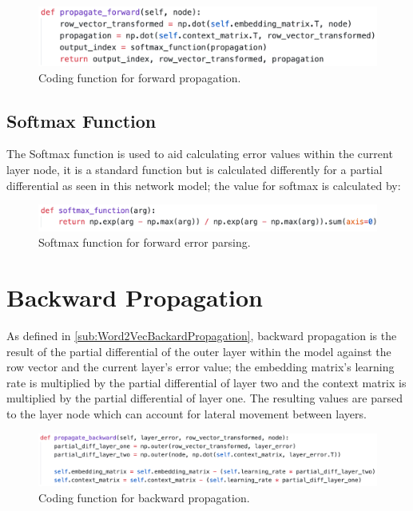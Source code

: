 \begin{figure}[H]
    \centering
    \includegraphics[width=\textwidth]{figures/chapter-6/forwardpropagation.png}
    \caption[Coding function for forward propagation]{Coding function for forward propagation.
    \label{fig:forwardpropagation}}
\end{figure}

\subsection{Softmax Function}

The Softmax function is used to aid calculating error values within the current layer node, it is a standard function but is calculated differently for a partial differential as seen in this network model; the value for softmax is calculated by:

\begin{figure}[H]
    \centering
    \includegraphics[width=\textwidth]{figures/chapter-6/softmaxfunction.png}
    \caption[Softmax function for forward error parsing]{Softmax function for forward error parsing.
    \label{fig:softmaxfunction}}
\end{figure}

\section{Backward Propagation}

As defined in \autoref{sub:Word2VecBackardPropagation}, backward propagation is the result of the partial differential of the outer layer within the model against the row vector and the current layer's error value; the embedding matrix's learning rate is multiplied by the partial differential of layer two and the context matrix is multiplied by the partial differential of layer one. The resulting values are parsed to the layer node which can account for lateral movement between layers.

\begin{figure}[H]
    \centering
    \includegraphics[width=\textwidth]{figures/chapter-6/backwardpropagation.png}
    \caption[Coding function for backward propagation]{Coding function for backward propagation.
    \label{fig:backwardpropagation}}
\end{figure}

